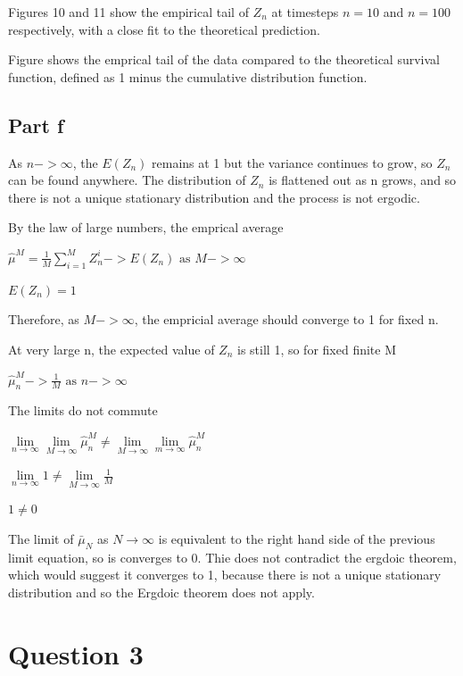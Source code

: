 \documentclass{article}
\begin{document}
Figures 10 and 11 show the empirical tail of $Z_n$ at timesteps $n=10$ and $n=100$ respectively, with a close fit to the theoretical prediction. 




Figure shows the emprical tail of the data compared to the theoretical survival function, defined as 1 minus the cumulative distribution function.


\subsection{Part f}

As $n-> \infty$, the $E(Z_n)$ remains at 1 but the variance continues to grow, so $Z_n$ can be found anywhere. The distribution of $Z_n$ is flattened out as n grows, and so there is not a unique stationary distribution and the process is not ergodic. 

By the law of large numbers, the emprical average

$\hat{\mu}^M = \frac{1}{M} \sum_{i=1}^{M}Z_n^i -> E(Z_n) \text{ as } M -> \infty$

$E(Z_n) = 1$

Therefore, as $M -> \infty$, the empricial average should converge to 1 for fixed n.

At very large n, the expected value of $Z_n$ is still 1, so for fixed finite M  

$\hat{\mu}_n^M -> \frac{1}{M} \text{ as } n -> \infty$

\bigskip

The limits do not commute

$\lim\limits_{n\to\infty} \lim\limits_{M\to\infty} \hat{\mu}_n^M \neq \lim\limits_{M\to\infty} \lim\limits_{m\to\infty} \hat{\mu}_n^M$

$\lim\limits_{n\to\infty} 1 \neq \lim\limits_{M\to\infty} \frac{1}{M}$

$1 \neq 0$
 
\bigskip

The limit of $\bar{\mu}_N$ as $N\to\infty$ is equivalent to the right hand side of the previous limit equation, so is converges to 0. Thie does not contradict the ergdoic theorem, which would suggest it converges to 1, because there is not a unique stationary distribution and so the Ergdoic theorem does not apply. 
 




\section{Question 3}
\end{document}
